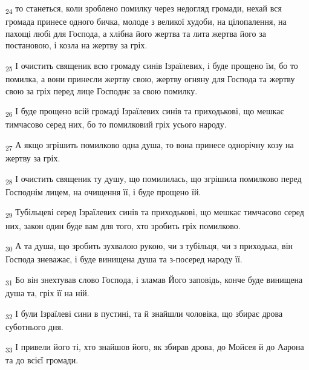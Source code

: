 \begin{tcolorbox}
\textsubscript{24} то станеться, коли зроблено помилку через недогляд громади, нехай вся громада принесе одного бичка, молоде з великої худоби, на цілопалення, на пахощі любі для Господа, а хлібна його жертва та лита жертва його за постановою, і козла на жертву за гріх.
\end{tcolorbox}
\begin{tcolorbox}
\textsubscript{25} І очистить священик всю громаду синів Ізраїлевих, і буде прощено їм, бо то помилка, а вони принесли жертву свою, жертву огняну для Господа та жертву свою за гріх перед лице Господнє за свою помилку.
\end{tcolorbox}
\begin{tcolorbox}
\textsubscript{26} І буде прощено всій громаді Ізраїлевих синів та приходькові, що мешкає тимчасово серед них, бо то помилковий гріх усього народу.
\end{tcolorbox}
\begin{tcolorbox}
\textsubscript{27} А якщо згрішить помилково одна душа, то вона принесе однорічну козу на жертву за гріх.
\end{tcolorbox}
\begin{tcolorbox}
\textsubscript{28} І очистить священик ту душу, що помилилась, що згрішила помилково перед Господнім лицем, на очищення її, і буде прощено їй.
\end{tcolorbox}
\begin{tcolorbox}
\textsubscript{29} Тубільцеві серед Ізраїлевих синів та приходькові, що мешкає тимчасово серед них, закон один буде вам для того, хто зробить гріх помилково.
\end{tcolorbox}
\begin{tcolorbox}
\textsubscript{30} А та душа, що зробить зухвалою рукою, чи з тубільця, чи з приходька, він Господа зневажає, і буде винищена душа та з-посеред народу її.
\end{tcolorbox}
\begin{tcolorbox}
\textsubscript{31} Бо він знехтував слово Господа, і зламав Його заповідь, конче буде винищена душа та, гріх її на ній.
\end{tcolorbox}
\begin{tcolorbox}
\textsubscript{32} І були Ізраїлеві сини в пустині, та й знайшли чоловіка, що збирає дрова суботнього дня.
\end{tcolorbox}
\begin{tcolorbox}
\textsubscript{33} І привели його ті, хто знайшов його, як збирав дрова, до Мойсея й до Аарона та до всієї громади.
\end{tcolorbox}
